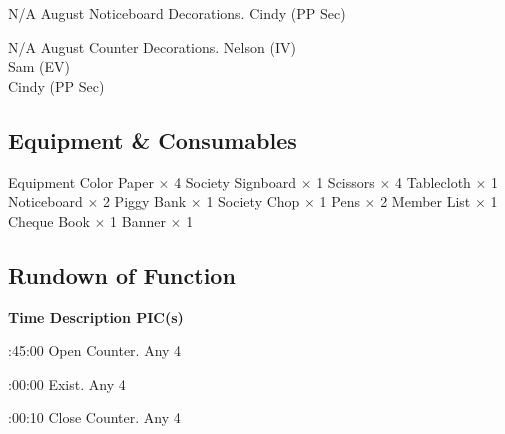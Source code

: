 \bTR\bTD N/A
\eTD{} August
\eTD\bTD Noticeboard Decorations.
\eTD\bTD Cindy (PP Sec)
\eTD\eTR

\bTR\bTD N/A
\eTD{} August
\eTD\bTD Counter Decorations.
\eTD\bTD Nelson (IV) \\ Sam (EV) \\ Cindy (PP Sec)
\eTD\eTR

\eTABLEbody
\eTABLE

\subsection{Equipment \& Consumables}
\starttabulate[|l|l|]
\NC{}Equipment\NC\NR
\HL
\NC Color Paper \NC $\times$ 4 \NR
\NC Society Signboard \NC $\times$ 1 \NR
\NC Scissors \NC $\times$ 4 \NR
\NC Tablecloth \NC $\times$ 1 \NR
\NC Noticeboard \NC $\times$ 2 \NR
\NC Piggy Bank \NC $\times$ 1 \NR
\NC Society Chop \NC $\times$ 1 \NR
\NC Pens \NC $\times$ 2 \NR
\NC Member List \NC $\times$ 1 \NR
\NC Cheque Book \NC $\times$ 1 \NR
\NC Banner \NC $\times$ 1 \NR
\HL
\stoptabulate

\subsection{Rundown of Function}

\setupTABLE[c][1][width=1.25in]
\setupTABLE[c][2][width=3.5in]
\setupTABLE[c][3][width=1.25in]
\bTABLE
\bTABLEhead

\bTR\bTH    \bf{Time}
\eTH\bTH    \bf{Description}
\eTH\bTH    \bf{PIC(s)}
\eTH\eTR

\eTABLEhead
\bTABLEbody

\bTR{}:45:00
\eTD\bTD Open Counter.
\eTD\bTD Any 4
\eTD\eTR

\bTR{}:00:00
\eTD\bTD Exist.
\eTD\bTD Any 4
\eTD\eTR

\bTR{}:00:10
\eTD\bTD Close Counter.
\eTD\bTD Any 4
\eTD\eTR

\eTABLEbody
\eTABLE

\stopsection
\pagebreak
